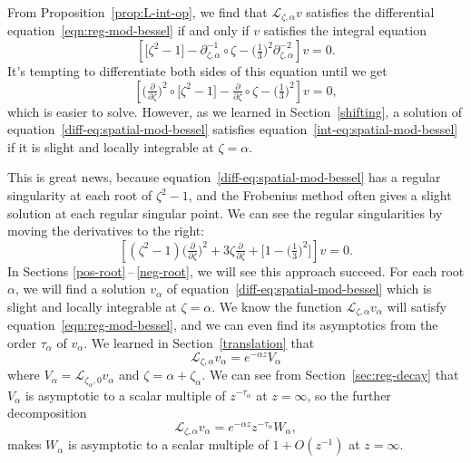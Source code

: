 \documentclass{article}
\newcommand{\fracderiv}[3]{\partial^{#1}_{#2, #3}}
\newcommand{\laplace}{\mathcal{L}}
\theoremstyle{definition}
\theoremstyle{plain}
\newenvironment{old}{\color{RoyalBlue}}{\color{black}}
\begin{document}
\begin{old}
From Proposition~\ref{prop:L-int-op}, we find that $\laplace_{\zeta, \alpha} v$ satisfies the differential equation~\eqref{eqn:reg-mod-bessel} if and only if $v$ satisfies the integral equation
\begin{equation}\label{int-eq:spatial-mod-bessel}
\left[ \big[ \zeta^2 - 1 \big] - \fracderiv{-1}{\zeta}{\alpha} \circ \zeta - \big(\tfrac{1}{3}\big)^2 \fracderiv{-2}{\zeta}{\alpha} \right] v = 0.
\end{equation}
It's tempting to differentiate both sides of this equation until we get
\begin{equation}\label{diff-eq:spatial-mod-bessel}
\left[ \big(\tfrac{\partial}{\partial \zeta}\big)^2 \circ \big[ \zeta^2 - 1 \big] - \tfrac{\partial}{\partial \zeta} \circ \zeta - \big(\tfrac{1}{3}\big)^2 \right] v = 0,
\end{equation}
which is easier to solve. However, as we learned in Section~\ref{shifting}, a solution of equation~\eqref{diff-eq:spatial-mod-bessel} satisfies equation~\eqref{int-eq:spatial-mod-bessel} if it is slight and locally integrable at $\zeta = \alpha$. 

This is great news, because equation~\eqref{diff-eq:spatial-mod-bessel} has a regular singularity at each root of $\zeta^2 - 1$, and the Frobenius method often gives a slight solution at each regular singular point. We can see the regular singularities by moving the derivatives to the right:
\[ \left[ (\zeta^2 - 1) \big(\tfrac{\partial}{\partial \zeta}\big)^2 + 3\zeta \tfrac{\partial}{\partial \zeta} + \big[ 1 - \big(\tfrac{1}{3}\big)^2 \big] \right] v = 0. \]
In Sections \ref{pos-root}\,--\,\ref{neg-root}, we will see this approach succeed. For each root $\alpha$, we will find a solution $v_\alpha$ of equation~\eqref{diff-eq:spatial-mod-bessel} which is slight and locally integrable at $\zeta = \alpha$. We know the function $\laplace_{\zeta, \alpha} v_\alpha$ will satisfy equation~\eqref{eqn:reg-mod-bessel}, and we can even find its asymptotics from the order $\tau_\alpha$ of $v_\alpha$. We learned in Section~\ref{translation} that
\[ \laplace_{\zeta, \alpha} v_\alpha = e^{-\alpha z} V_\alpha \]
where $V_\alpha = \laplace_{\zeta_\alpha, 0} v_\alpha$ and $\zeta = \alpha + \zeta_\alpha$. We can see from Section~\ref{sec:reg-decay} that $V_\alpha$ is asymptotic to a scalar multiple of $z^{ - \tau_\alpha}$ at $z = \infty$, so the further decomposition
\[ \laplace_{\zeta, \alpha} v_\alpha = e^{-\alpha z} z^{-\tau_\alpha} W_\alpha, \]
makes $W_\alpha$ is asymptotic to a scalar multiple of $1+O(z^{-1})$ at $z = \infty$.

\end{old}
\end{document}
